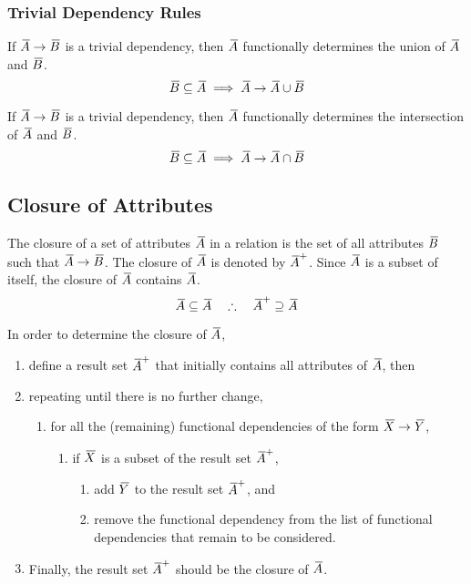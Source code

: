 \subsubsection{Trivial Dependency Rules}

If \( \itol{A} \rightarrow \itol{B} \) is a trivial dependency, then \( \itol{A} \) functionally determines the union of \( \itol{A} \) and \( \itol{B} \)\@.
\begin{equation*}
  \itol{B} \subseteq \itol{A} \implies \itol{A} \rightarrow \itol{A} \cup \itol{B}
\end{equation*}

If \( \itol{A} \rightarrow \itol{B} \) is a trivial dependency, then \( \itol{A} \) functionally determines the intersection of \( \itol{A} \) and \( \itol{B} \).
\begin{equation*}
  \itol{B} \subseteq \itol{A} \implies \itol{A} \rightarrow \itol{A} \cap \itol{B}
\end{equation*}

\subsection{Closure of Attributes}

The closure of a set of attributes \( \itol{A} \) in a relation is the set of all attributes \( \itol{B} \) such that \( \itol{A} \rightarrow \itol{B} \)\@.
The closure of \( \itol{A} \) is denoted by \( \itol{A}^{+} \)\@.
Since \( \itol{A} \) is a subset of itself, the closure of \( \itol{A} \) contains \( \itol{A} \)\@.
\begin{equation*}
  \itol{A} \subseteq \itol{A} \quad \therefore \quad \itol{A}^{+} \supseteq \itol{A}
\end{equation*}

In order to determine the closure of \( \itol{A} \),
\begin{enumerate}
  \item define a result set \( \itol{A}^{+} \) that initially contains all attributes of \( \itol{A} \), then
  \item repeating until there is no further change,
  \begin{enumerate}
    \item for all the (remaining) functional dependencies of the form \( \itol{X} \rightarrow \itol{Y} \),
    \begin{enumerate}
      \item if \( \itol{X} \) is a subset of the result set \( \itol{A}^{+} \),
      \begin{enumerate}
        \item add \( \itol{Y} \) to the result set \( \itol{A}^{+} \), and
        \item remove the functional dependency from the list of functional dependencies that remain to be considered.
      \end{enumerate}
    \end{enumerate}
  \end{enumerate}
  \item Finally, the result set \( \itol{A}^{+} \) should be the closure of \( \itol{A} \)\@.
\end{enumerate}

